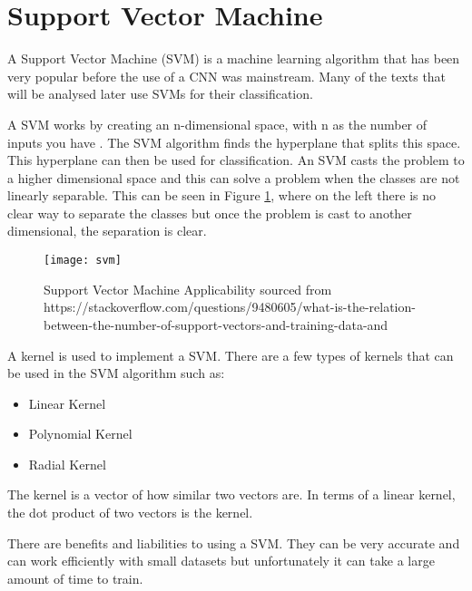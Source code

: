 \section{Support Vector Machine}
A Support Vector Machine (SVM) is a machine learning algorithm that has been
very popular before the use of a CNN was mainstream.
Many of the texts that will be analysed later use SVMs for their classification.

A SVM works by creating an n-dimensional space, with n as the number of
inputs you have \parencite{svm}. The SVM algorithm finds the hyperplane that splits this space.
This hyperplane can then be used for classification. 
An SVM casts the problem to a higher dimensional space and this can solve a problem when the classes are not linearly separable.
This can be seen in Figure \ref{fig:svm}, where on the left there is no clear way to separate the classes but once the problem is cast to another dimensional, the separation is clear.

\begin{figure}[h]
	\centering
    \texttt{[image: svm]}
    \caption{Support Vector Machine Applicability sourced from https://stackoverflow.com/questions/9480605/what-is-the-relation-between-the-number-of-support-vectors-and-training-data-and}
    \label{fig:svm}
\end{figure}

A kernel is used to implement a SVM.
There are a few types of kernels that can be used in the SVM algorithm such as:
\begin{itemize}
	\item{Linear Kernel}
	\item{Polynomial Kernel}
	\item{Radial Kernel}
\end{itemize}
The kernel is a vector of how similar two vectors are.
In terms of a linear kernel, the dot product of two vectors is the kernel.

There are benefits and liabilities to using a SVM.
They can be very accurate and can work efficiently with small datasets but unfortunately it can take a large amount of time to train. 
